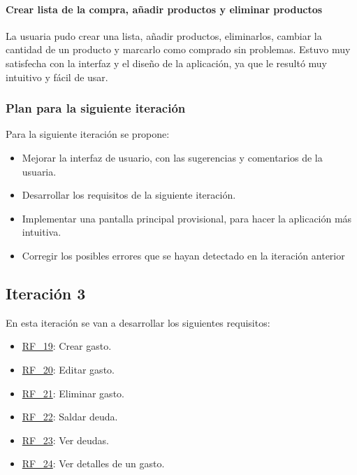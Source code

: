 \paragraph{Crear lista de la compra, añadir productos y eliminar productos}
\parbox{\textwidth}{ 
   
}

La usuaria pudo crear una lista, añadir productos, eliminarlos, cambiar la cantidad de un producto y marcarlo como comprado sin problemas. 
Estuvo muy satisfecha con la interfaz y el diseño de la aplicación, ya que le resultó muy intuitivo y fácil de usar.

\subsubsection{Plan para la siguiente iteración}

Para la siguiente iteración se propone:

\begin{itemize}
    \item Mejorar la interfaz de usuario, con las sugerencias y comentarios de la usuaria.
    \item Desarrollar los requisitos de la siguiente iteración.
    \item Implementar una pantalla principal provisional, para hacer la aplicación más intuitiva.
    \item Corregir los posibles errores que se hayan detectado en la iteración anterior
\end{itemize}

\subsection{Iteración 3}

En esta iteración se van a desarrollar los siguientes requisitos:

\begin{itemize}
    \item {\hyperref[req:RF19]{RF\_19}}: Crear gasto.
    \item {\hyperref[req:RF20]{RF\_20}}: Editar gasto.
    \item {\hyperref[req:RF21]{RF\_21}}: Eliminar gasto.
    \item {\hyperref[req:RF22]{RF\_22}}: Saldar deuda.
    \item {\hyperref[req:RF23]{RF\_23}}: Ver deudas.
    \item {\hyperref[req:RF24]{RF\_24}}: Ver detalles de un gasto.
\end{itemize}

